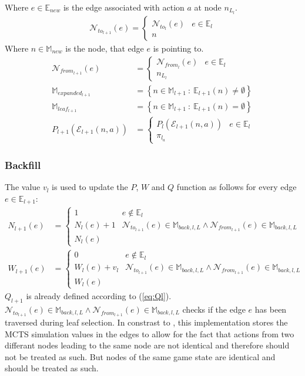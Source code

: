 \documentclass[12pt]{article}
\newcommand{\quckeq}[1]{(\ref{#1})}
\newcommand{\InBreadcrums}[0]{\mathcal N_{to_{l+1}}(e) \in \mathbb M_{back,l,L} \land \mathcal N_{from_{l+1}}(e) \in \mathbb M_{back,l,L}}
\begin{document}
Where \(e \in\mathbb E_{new}\) is the edge associated with action \(a\) at node \(n_{L_l}\).
\begin{align}
\mathcal N_{to_{l+1}}(e) = 
\left\{
\begin{matrix}
\mathcal N_{to_l} (e) & e \in \mathbb E_l\\
n &
\end{matrix}
\right.
\end{align}
Where \(n\in\mathbb M_{new}\) is the node, that edge \(e\) is pointing to.
\begin{align}
\mathcal N_{from_{l+1}}(e) &= 
\left\{
\begin{matrix}
\mathcal N_{from_l} (e) & e \in\mathbb E_l\\
n _{L_l}&
\end{matrix}
\right.\\
\mathbb M_{expanded_{l+1}} &= \left\{n\in\mathbb M_{l+1}~:~\mathbb E_{l+1}(n) \neq \emptyset\right\}\\
\mathbb M_{leaf_{l+1}} &= \left\{n\in\mathbb M_{l+1}~:~\mathbb E_{l+1}(n) = \emptyset\right\}\\
P_{l+1}(\mathcal E_{l+1}(n, a)) &= 
\left\{
\begin{matrix}
P_l (\mathcal E_{l+1}(n, a)) & e \in\mathbb E_l\\
\pi_{l_a}&
\end{matrix}
\right.
\end{align}



\subsubsection{Backfill}
\label{sec:Methods:MCTS:Backfill}
The value \(v_l\) is used to update the \(P\), \(W\) and \(Q\) function as follows for every edge \(e\in\mathbb E_{l+1}\):
\begin{align}
N_{l+1}(e) &= \left\{\begin{matrix}
1 & e \not\in\mathbb E_l\\
N_l(e)+1 & \InBreadcrums\\
N_l(e)
\end{matrix}\right.\\
%
W_{l+1}(e) &= \left\{\begin{matrix}
0 & e \not\in\mathbb E_l\\
W_l(e)+v_l & \InBreadcrums\\
W_l(e)
\end{matrix}\right.
\end{align}
\(Q_{l+1}\) is already defined according to \quckeq{eq:Ql}. \(\InBreadcrums\) checks if the edge \(e\) has been traversed during leaf selection. \cite{chaslot2008parallel} In constrast to \cite{silver2018general}, this implementation stores the MCTS simulation values in the edges to allow for the fact that actions from two differant nodes leading to the same node are not identical and therefore should not be treated as such. But nodes of the same game state are identical and should be treated as such.
\end{document}

